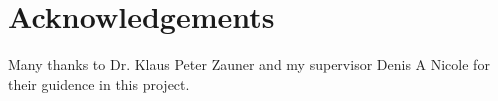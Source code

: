 \section*{Acknowledgements}
Many thanks to Dr. Klaus Peter Zauner and my supervisor Denis A Nicole for their guidence in this project.